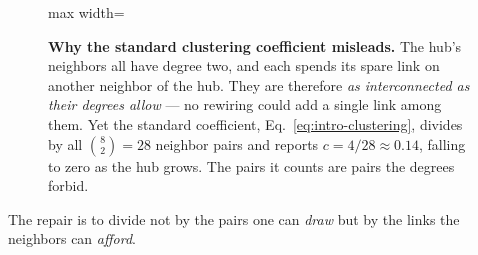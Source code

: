 \begin{figure}[t]
\centering
\begin{adjustbox}{max width=\linewidth}\end{adjustbox}
\caption{\textbf{Why the standard clustering coefficient misleads.} The hub's
neighbors all have degree two, and each spends its spare link on another neighbor
of the hub. They are therefore \emph{as interconnected as their degrees allow} ---
no rewiring could add a single link among them. Yet the standard coefficient,
Eq.~\eqref{eq:intro-clustering}, divides by all $\binom{8}{2}=28$ neighbor pairs
and reports $c=4/28\approx0.14$, falling to zero as the hub grows. The pairs it
counts are pairs the degrees forbid.}
\label{fig:intro-doublestar}
\end{figure}

The repair is to divide not by the pairs one can \emph{draw} but by the links the
neighbors can \emph{afford}.

